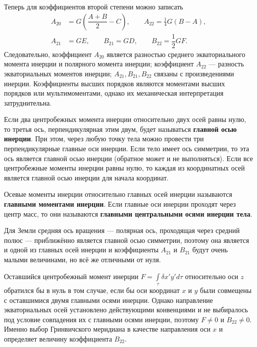 \documentclass[11pt, a4paper,addpoints]{exam}
\theoremstyle{remark}
\begin{document}
    Теперь для коэффициентов второй степени можно записать
    \begin{align*}
        A_{20} &= G\left( \dfrac{A + B}{2} - C \right), \qquad
        A_{22} = \frac{1}{4}G\left( B - A \right), \\
        A_{21} &= GE,  \qquad
        B_{21} = GD,  \qquad
        B_{22} = \dfrac{1}{2}GF.
    \end{align*}
    Следовательно, коэффициент $A_{20}$ является разностью среднего экваториального момента инерции
    и полярного момента инерции; коэффициент $A_{22}$ --- разность экваториальных моментов инерции;
    $A_{21}, B_{21}, B_{22}$ связаны с произведениями инерции. Коэффициенты высших порядков являются
    моментами высших порядков или мультимоментами, однако их механическая интерпретация
    затруднительна.

    Если два центробежных момента инерции относительно двух осей равны нулю, то третья ось,
    перпендикулярная этим двум, будет называться \textbf{главной осью инерции}. При этом, через
    любую точку тела можно провести три перпендикулярные главные оси инерции. Если тело имеет ось
    симметрии, то эта ось является главной осью инерции (обратное может и не выполняться).
    Если все центробежные моменты инерции равны нулю, то каждая из координатных осей является
    главной осью инерции для начала координат.

    Осевые моменты инерции относительно главных осей инерции называются \textbf{главными моментами
    инерции}. Если главные оси инерции проходят через центр масс, то они называются \textbf{главными
    центральными осями инерции тела}.

    Для Земли средняя ось вращения --- полярная ось, проходящая через средний полюс --- 
    приближённо является главной осью симметрии, поэтому она является и одной из главных осей
    инерции и коэффициенты $A_{21}$ и $B_{21}$ будут очень малыми величинами, но всё же отличными от
    нуля.

    Оставшийся центробежный момент инерции $F = \int\limits_\tau \delta x' y' d\tau$
    относительно оси $z$ обратился бы  в нуль  в том случае, если бы оси координат $x$ и $y$
    были совмещены с оставшимися двумя главными осями инерции. Однако направление экваториальных осей
    установлено действующими конвенциями и не выбиралось под условие совпадения их с главными осями
    инерции, поэтому $F \neq 0$ и $B_{22} \neq 0$. Именно выбор Гринвичского меридиана в качестве
    направления оси $x$ и определяет величину коэффициента $B_{22}$.
\end{document}
